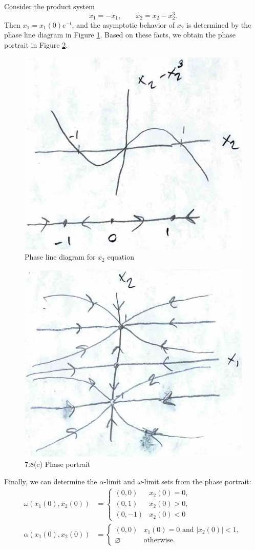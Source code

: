 \documentclass[nonumber]{homework}
\begin{document}
	Consider the product system
	\begin{equation*}
		\dot{x}_1 = -x_1, \qquad \dot{x}_2 = x_2 -x_2^3.
	\end{equation*}
	Then $x_1 = x_1(0)e^{-t}$, and the asymptotic behavior of $x_2$ is determined by the phase line diagram in Figure \ref{fig:78c_pld}. Based on these facts, we obtain the phase portrait in Figure \ref{fig:78c}.
	\begin{figure}[h]
		\centering
		\includegraphics[width=.6\textwidth]{p78c_pld.png}
		\caption{Phase line diagram for $x_2$ equation}
		\label{fig:78c_pld}
	\end{figure}
	\begin{figure}[h]
		\centering
		\includegraphics[width=.6\textwidth]{p78c.png}
		\caption{7.8(c) Phase portrait}
		\label{fig:78c}
	\end{figure}
	Finally, we can determine the $\alpha$-limit and $\omega$-limit sets from the phase portrait:
	\begin{align*}
		\omega(x_1(0), x_2(0)) &= \begin{cases}
			(0,0) & x_2(0) = 0, \\
			(0,1) & x_2(0) > 0, \\
			(0, -1) & x_2(0) < 0
		\end{cases}\\[0.5em]
		\alpha(x_1(0), x_2(0)) &= \begin{cases}
			(0,0) & x_1(0) = 0 \text{ and } |x_2(0)| < 1, \\
			\varnothing & \text{otherwise}.
		\end{cases}
	\end{align*}
	
\end{document}
